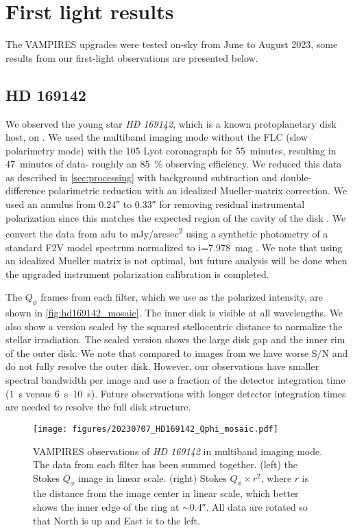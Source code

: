 \section{First light results}\label{sec:firstlight}

The VAMPIRES upgrades were tested on-sky from June to August 2023, some results from our first-light observations are presented below.

\subsection{HD 169142\label{sec:hd169142}}

We observed the young star \textit{HD 169142}, which is a known protoplanetary disk host, on . We used the multiband imaging mode without the FLC (slow polarimetry mode) with the \SI{105}{\mas} Lyot coronagraph for \SI{55}{minutes}, resulting in \SI{47}{minutes} of data- roughly an \SI{85}{\%} observing efficiency. We reduced this data as described in \autoref{sec:processing} with background subtraction and double-difference polarimetric reduction with an idealized Mueller-matrix correction. We used an annulus from \ang{;;0.24} to \ang{;;0.33} for removing residual instrumental polarization since this matches the expected region of the cavity of the disk \citep{bertrang_hd_2018}. We convert the data from \si{adu} to \si{mJy/arcsec^2} using a synthetic photometry of a standard F2V model spectrum \citep{pickles_stellar_1998} normalized to i=\SI{7.978}{mag} \citep{zacharias_fourth_2013}. We note that using an idealized Mueller matrix is not optimal, but future analysis will be done when the upgraded instrument polarization calibration is completed.

The $Q_\phi$ frames from each filter, which we use as the polarized intensity, are shown in \autoref{fig:hd169142_mosaic}. The inner disk is visible at all wavelengths. We also show a version scaled by the squared stellocentric distance to normalize the stellar irradiation. The scaled version shows the large disk gap and the inner rim of the outer disk. We note that compared to images from \cite{bertrang_hd_2018} we have worse S/N and do not fully resolve the outer disk. However, our observations have smaller spectral bandwidth per image and use a fraction of the detector integration time (\SI{1}{s} versus \SIrange{6}{10}{s}). Future observations with longer detector integration times are needed to resolve the full disk structure.

\begin{figure}
    \centering
    \texttt{[image: figures/20230707\_HD169142\_Qphi\_mosaic.pdf]}
    \caption{ VAMPIRES observations of \textit{HD 169142} in multiband imaging mode. The data from each filter has been summed together. (left) the Stokes $Q_\phi$ image in linear scale. (right) Stokes $Q_\phi\times r^2$, where $r$ is the distance from the image center in linear scale, which better shows the inner edge of the ring at $\sim$\ang{;;0.4}. All data are rotated so that North is up and East is to the left.\label{fig:hd169142_mosaic}}
\end{figure}

